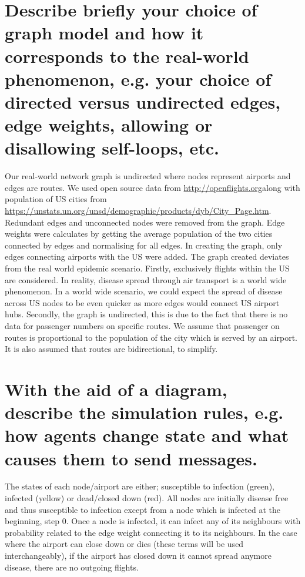 \documentclass[a4paper,11pt]{article}
\begin{document}
\section{Describe briefly your choice of graph model and how it corresponds to the real-world phenomenon, e.g. your choice of directed versus undirected edges, edge weights, allowing or disallowing self-loops, etc.}

Our real-world network graph is undirected where nodes represent airports and edges are routes. We used open source data from \url{http://openflights.org}along with population of US cities from \url{https://unstats.un.org/unsd/demographic/products/dyb/City_Page.htm}. Redundant edges and unconnected nodes were removed from the graph. Edge weights were calculates by getting the average population of the two cities connected by edges and normalising for all edges. In creating the graph, only edges connecting airports with the US were added.
The graph created deviates from the real world epidemic scenario. Firstly, exclusively flights within the US are considered. In reality, disease spread through air transport is a world wide phenomenon. In a world wide scenario, we could expect the spread of disease across US nodes to be even quicker as more edges would connect US airport hubs. Secondly, the graph is undirected, this is due to the fact that there is no data for passenger numbers on specific routes. We assume that passenger on routes is proportional to the population of the city which is served by an airport. It is also assumed that routes are bidirectional, to simplify.


\section{With the aid of a diagram, describe the simulation rules, e.g. how agents change state and what causes them to send messages.}

The states of each node/airport are either; susceptible to infection (green), infected (yellow) or dead/closed down (red). All nodes are initially disease free and thus susceptible to infection except from a node which is infected at the beginning, step 0. Once a node is infected, it can infect any of its neighbours with probability related to the edge weight connecting it to its neighbours. In the case where the airport can close down or dies (these terms will be used interchangeably), if the airport has closed down it cannot spread anymore disease, there are no outgoing flights. 
\end{document}
